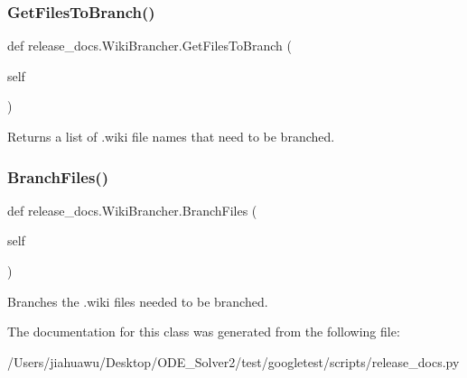 \subsubsection{\texorpdfstring{Get\+Files\+To\+Branch()}{GetFilesToBranch()}}
{\footnotesize\ttfamily def release\+\_\+docs.\+Wiki\+Brancher.\+Get\+Files\+To\+Branch (\begin{DoxyParamCaption}\item[{}]{self }\end{DoxyParamCaption})}

\begin{DoxyVerb}Returns a list of .wiki file names that need to be branched.\end{DoxyVerb}
 \mbox{\label{classrelease__docs_1_1_wiki_brancher_a5ef284f7e1742f465ecd0c14d2667327}} 
\subsubsection{\texorpdfstring{Branch\+Files()}{BranchFiles()}}
{\footnotesize\ttfamily def release\+\_\+docs.\+Wiki\+Brancher.\+Branch\+Files (\begin{DoxyParamCaption}\item[{}]{self }\end{DoxyParamCaption})}

\begin{DoxyVerb}Branches the .wiki files needed to be branched.\end{DoxyVerb}
 

The documentation for this class was generated from the following file\+:\begin{DoxyCompactItemize}
\item 
/\+Users/jiahuawu/\+Desktop/\+O\+D\+E\+\_\+\+Solver2/test/googletest/scripts/release\+\_\+docs.\+py\end{DoxyCompactItemize}
